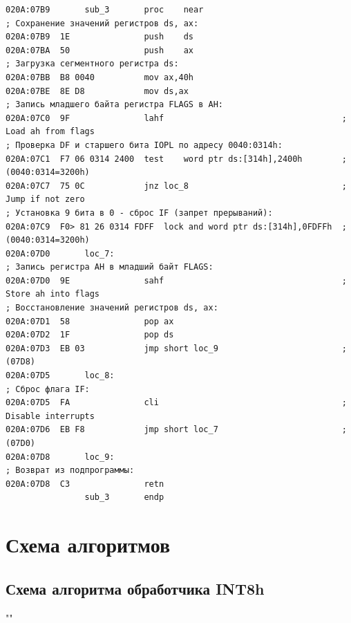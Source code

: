 \documentclass[a4paper,12pt]{article}
\begin{document}
\begin{lstlisting}[style={asm}]
020A:07B9		sub_3		proc	near
; Сохранение значений регистров ds, ax:
020A:07B9  1E				push	ds
020A:07BA  50				push	ax
; Загрузка сегментного регистра ds:
020A:07BB  B8 0040			mov	ax,40h
020A:07BE  8E D8			mov	ds,ax
; Запись младшего байта регистра FLAGS в AH:
020A:07C0  9F				lahf				                    ; Load ah from flags
; Проверка DF и старшего бита IOPL по адресу 0040:0314h:
020A:07C1  F7 06 0314 2400	test	word ptr ds:[314h],2400h	    ; (0040:0314=3200h)
020A:07C7  75 0C			jnz	loc_8			                    ; Jump if not zero
; Установка 9 бита в 0 - сброс IF (запрет прерываний):
020A:07C9  F0> 81 26 0314 FDFF	lock and word ptr ds:[314h],0FDFFh	; (0040:0314=3200h)
020A:07D0		loc_7:
; Запись регистра AH в младший байт FLAGS:
020A:07D0  9E				sahf				                    ; Store ah into flags
; Восстановление значений регистров ds, ax:
020A:07D1  58				pop	ax
020A:07D2  1F				pop	ds
020A:07D3  EB 03			jmp	short loc_9		                    ; (07D8)
020A:07D5		loc_8:
; Сброс флага IF:
020A:07D5  FA				cli				                        ; Disable interrupts
020A:07D6  EB F8			jmp	short loc_7		                    ; (07D0)
020A:07D8		loc_9:
; Возврат из подпрограммы:
020A:07D8  C3				retn
				sub_3	    endp
\end{lstlisting}
\clearpage

\section{Схема алгоритмов}

\subsection{Схема алгоритма обработчика INT8h}
""\newline
\end{document}
